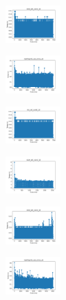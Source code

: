 \begin{figure}[H]
\begin{subfigure}
        \centering
        \includegraphics[width=0.234\textwidth]{img/am01/rand_set_const_10_277451237_time.png}
    \end{subfigure}
    \hfill
    \begin{subfigure}
        \centering
        \includegraphics[width=0.234\textwidth]{img/am01/newthyroid_set_const_10_277451237_time.png}
    \end{subfigure}
    \hfill
    \begin{subfigure}
        \centering
        \includegraphics[width=0.234\textwidth]{img/am01/iris_set_const_10_49258669_time.png}
    \end{subfigure}
    \hfill
    \begin{subfigure}
        \centering
        \includegraphics[width=0.234\textwidth]{img/am01/ecoli_set_const_10_49258669_time.png}
    \end{subfigure}
    \hfill
    \begin{subfigure}
        \centering
        \includegraphics[width=0.234\textwidth]{img/am01/rand_set_const_10_49258669_time.png}
    \end{subfigure}
    \hfill
    \begin{subfigure}
        \centering
        \includegraphics[width=0.234\textwidth]{img/am01/newthyroid_set_const_10_49258669_time.png}

\end{subfigure}
\end{figure}
